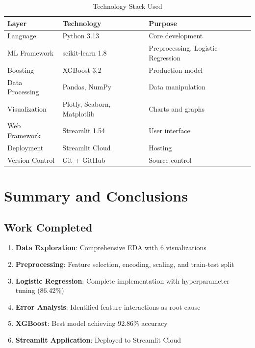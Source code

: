\documentclass[12pt,a4paper]{article}
\begin{document}
\begin{table}[H]
\centering
\caption{Technology Stack Used}
\begin{tabular}{lll}
\toprule
\textbf{Layer} & \textbf{Technology} & \textbf{Purpose} \\
\midrule
Language & Python 3.13 & Core development \\
ML Framework & scikit-learn 1.8 & Preprocessing, Logistic Regression \\
Boosting & XGBoost 3.2 & Production model \\
Data Processing & Pandas, NumPy & Data manipulation \\
Visualization & Plotly, Seaborn, Matplotlib & Charts and graphs \\
Web Framework & Streamlit 1.54 & User interface \\
Deployment & Streamlit Cloud & Hosting \\
Version Control & Git + GitHub & Source control \\
\bottomrule
\end{tabular}
\end{table}

\newpage

\section{Summary and Conclusions}

\subsection{Work Completed}

\begin{enumerate}
    \item \textbf{Data Exploration}: Comprehensive EDA with 6 visualizations
    \item \textbf{Preprocessing}: Feature selection, encoding, scaling, and train-test split
    \item \textbf{Logistic Regression}: Complete implementation with hyperparameter tuning (86.42\%)
    \item \textbf{Error Analysis}: Identified feature interactions as root cause
    \item \textbf{XGBoost}: Best model achieving 92.86\% accuracy
    \item \textbf{Streamlit Application}: Deployed to Streamlit Cloud
\end{enumerate}
\end{document}
